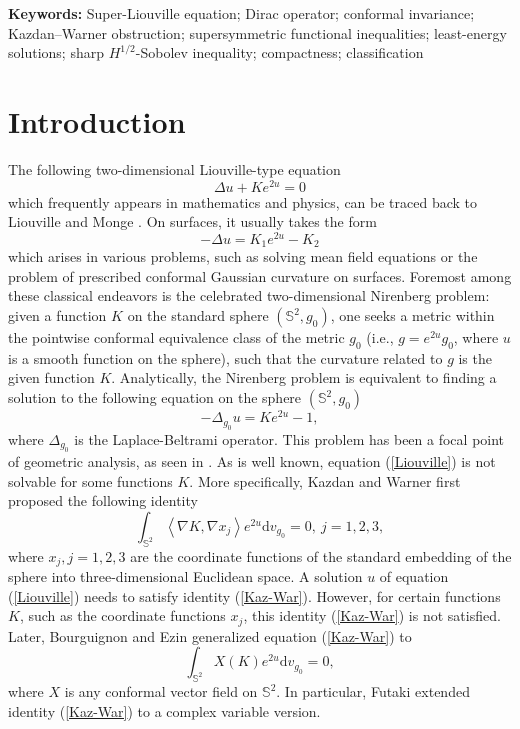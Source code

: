 \documentclass[a4paper, 12pt]{article}
\begin{document}
	{\bf Keywords:}  Super-Liouville equation; Dirac operator; conformal invariance; Kazdan–Warner obstruction; supersymmetric functional inequalities; least-energy solutions; sharp \(H^{1/2}\)-Sobolev inequality; compactness; classification
	
	
	\section{Introduction}
	
	
	
	The following two-dimensional Liouville-type equation
	$$\Delta u + K{e^{2u}} = 0$$
	which frequently appears in mathematics and physics, can be traced back to Liouville and Monge  \cite{Cai_xiaohan,liouville1853equation}. On surfaces, it usually takes the form
	\begin{equation*}
		- \Delta u = {K_1}{e^{2u}} - {K_2}
	\end{equation*}	
	which arises in various problems, such as solving mean field equations or the problem of prescribed conformal Gaussian curvature on surfaces. Foremost among these classical endeavors is the celebrated two-dimensional Nirenberg problem: given a function $K$ on the standard sphere $(\mathbb{S}^2,g_0)$, one seeks a metric within the pointwise conformal equivalence class of the metric $g_0$ (i.e., $g = e^{2u}g_0$, where $u$ is a smooth function on the sphere), such that the curvature related to $g$ is the given function $K$. Analytically, the Nirenberg problem is equivalent to finding a solution to the following equation on the sphere $\left(\mathbb{S}^2,g_0 \right) $
	\begin{equation}\label{Liouville}
		- \Delta_{g_0} u = K{e^{2u}} - 1,
	\end{equation}
	where $	 \Delta_{g_0} $ is the Laplace-Beltrami operator. This problem has been a focal point of geometric analysis, as seen in \cite{MR1417436,MR1261723,MR1131392,changMR0908146,chang1988conformal,MR896027,MR1338474,MR339258}. As is well known, equation (\ref{Liouville}) is not solvable for some functions $K$. More specifically,  Kazdan and Warner first proposed the following identity
	\begin{equation}\label{Kaz-War}
		\int_{{\mathbb{S}^2}} {\left\langle {\nabla K,\nabla {x_j}} \right\rangle {e^{2u}}{\text{d}}{v_{g_0}}  = 0,\  j = 1,2,3,}
	\end{equation}	
	where ${x_j},j = 1,2,3$ are the coordinate functions of the standard embedding of the sphere into three-dimensional Euclidean space. A solution $u$ of equation (\ref{Liouville}) needs to satisfy identity (\ref{Kaz-War}). However, for certain functions $K$, such as the coordinate functions $x_j$, this identity (\ref{Kaz-War}) is not satisfied. Later, Bourguignon and Ezin \cite{MR882712} generalized equation (\ref{Kaz-War}) to
	\begin{equation*}
		\int_{{\mathbb{S}^2}} {X\left( K \right){e^{2u}}} {\text{d}}{v_{g_0}} = 0,
	\end{equation*}	
	where $X$ is any conformal vector field on $\mathbb{S}^2$. In particular, Futaki \cite{MR718940} extended identity (\ref{Kaz-War}) to a complex variable version.
	
\end{document}
